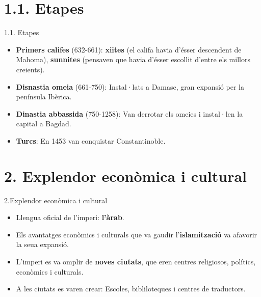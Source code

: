 \documentclass{beamer}
\begin{document}
  \section{1.1. Etapes}\label{etapes}
  \begin{frame}{1.1. Etapes}

  \begin{itemize}
     \itemsep1pt\parskip0pt
     \item  \textbf{Primers califes} (632-661): \textbf{xiites} (el califa havia  d'ésser descendent de Mahoma), \textbf{sunnites} (pensaven que havia  d'ésser escollit d'entre els millors creients).
      \item  \textbf{Disnastia omeia} (661-750): Instal·lats a Damasc, gran  expansió per la península Ibèrica.
      \item  \textbf{Dinastia abbassida} (750-1258): Van derrotar els omeies i  instal·len la capital a Bagdad.
      \item  \textbf{Turcs}: En 1453 van conquistar Constantinoble.

   \end{itemize}

   \end{frame}


   \section{2. Explendor econòmica i cultural}\label{explendor-econuxf2mica-i-cultural}

   \begin{frame}{2.Explendor econòmica i cultural}
   	
  \begin{itemize}

    \itemsep1pt\parskip0pt

    \item  Llengua oficial de l'imperi: \textbf{l'àrab}.
    \item  Els avantatges econòmics i culturals que va gaudir  l'\textbf{islamització} va afavorir la seua expansió.
    \item  L'imperi es va omplir de \textbf{noves ciutats}, que eren centres  religiosos, polítics, econòmics i culturals.
    \item  A les ciutats es varen crear: Escoles, bibliloteques i centres de  traductors.
  \end{itemize}

   \end{frame}
\end{document}
